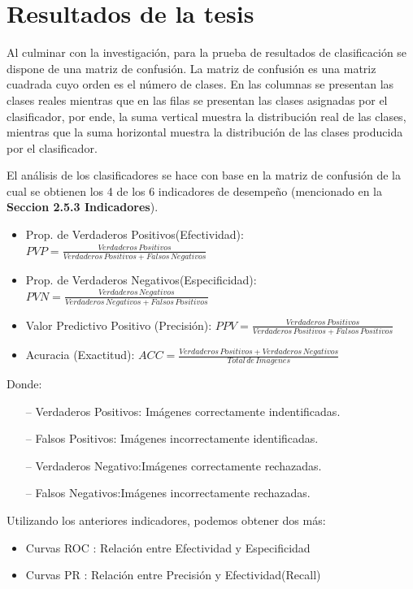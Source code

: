 \chapter{Resultados de la tesis}
\setcounter{page}{121}
\renewcommand{\baselinestretch}{1.2} %
	
	Al culminar con la investigación, para la prueba de resultados de clasificación se dispone de una matriz de confusión. La matriz de confusión es una matriz cuadrada cuyo orden es el número de clases. En las  columnas se presentan las clases reales mientras que en las filas se presentan las clases asignadas por el clasificador, por ende, la suma vertical muestra la distribución real de las clases, mientras que la suma horizontal muestra la distribución de las clases producida por el clasificador.

	El análisis de los clasificadores se hace con base en la matriz de confusión de la cual se obtienen los 4 de los 6 indicadores de desempeño (mencionado en la \textbf{Seccion 2.5.3 Indicadores}).

	\begin{itemize}

	\item Prop. de Verdaderos Positivos(Efectividad): {$PVP= \frac{Verdaderos\,Positivos}{{Verdaderos\,Positivos} + {Falsos\,Negativos}}$}
	\item Prop. de Verdaderos Negativos(Especificidad): {$PVN= \frac{Verdaderos\,Negativos}{{Verdaderos\,Negativos} + {Falsos\,Positivos}}$}
	\item Valor Predictivo Positivo (Precisión): {$PPV = \frac{Verdaderos\,Positivos}{{Verdaderos\,Positivos}+{Falsos\,Positivos}}$}
	\item Acuracia (Exactitud): {$ACC= \frac{Verdaderos\,Positivos+Verdaderos\,Negativos}{Total\,de\,Imagenes}$}
	\end{itemize}	
	Donde:
	\begin{itemize}
		\item[--] Verdaderos Positivos: Imágenes correctamente indentificadas.
		\item[--] Falsos Positivos: Imágenes incorrectamente identificadas.
		\item[--] Verdaderos Negativo:Imágenes correctamente rechazadas.
		\item[--] Falsos Negativos:Imágenes incorrectamente rechazadas.
	\end{itemize}
	
	Utilizando los anteriores indicadores, podemos obtener dos más:
	\begin{itemize}
		\item Curvas ROC : Relación entre Efectividad y Especificidad
		\item Curvas PR  : Relación entre Precisión y Efectividad(Recall)
	\end{itemize}

